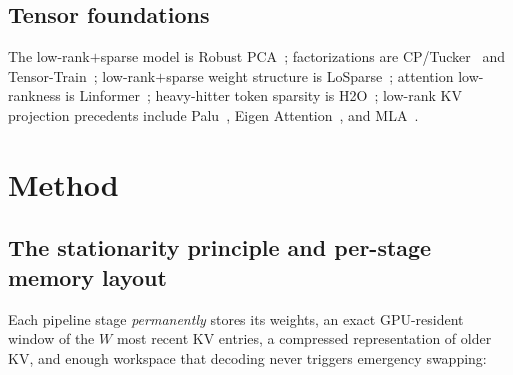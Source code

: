 \documentclass[11pt]{article}
\begin{document}
\subsection{Tensor foundations}
The low-rank$+$sparse model is Robust PCA~\cite{rpca}; factorizations are CP/Tucker~\cite{kolda}
and Tensor-Train~\cite{tt}; low-rank$+$sparse weight structure is LoSparse~\cite{losparse};
attention low-rankness is Linformer~\cite{linformer}; heavy-hitter token sparsity is
H2O~\cite{h2o}; low-rank KV projection precedents include Palu~\cite{palu}, Eigen
Attention~\cite{eigenattention}, and MLA~\cite{deepseekv2}.

\section{Method}
\label{sec:method}

\subsection{The stationarity principle and per-stage memory layout}
Each pipeline stage \emph{permanently} stores its weights, an exact GPU-resident window of the
$W$ most recent KV entries, a compressed representation of older KV, and enough workspace that
decoding never triggers emergency swapping:

\begin{center}
\end{center}
\end{document}
